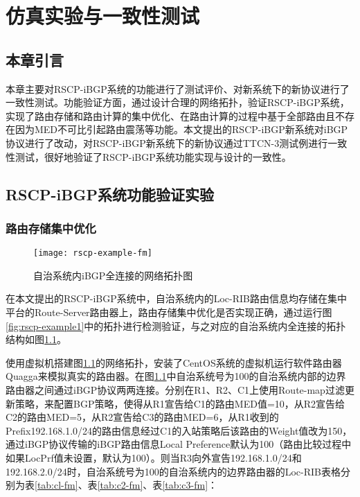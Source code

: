 \chapter{仿真实验与一致性测试}
\label{cha:evaluate}


\section{本章引言}
本章主要对RSCP-iBGP系统的功能进行了测试评价、对新系统下的新协议进行了一致性测试。功能验证方面，通过设计合理的网络拓扑，验证RSCP-iBGP系统，实现了路由存储和路由计算的集中优化、在路由计算的过程中基于全部路由且不存在因为MED不可比引起路由震荡等功能。本文提出的RSCP-iBGP新系统对iBGP协议进行了改动，对RSCP-iBGP新系统下的新协议通过TTCN-3测试例进行一致性测试，很好地验证了RSCP-iBGP系统功能实现与设计的一致性。

\section{RSCP-iBGP系统功能验证实验}

\subsection{路由存储集中优化}


\begin{figure}
  \centering
  \texttt{[image: rscp-example-fm]}
  \caption{自治系统内iBGP全连接的网络拓扑图}
  \label{fig:rscp-example-fm}
\end{figure}

在本文提出的RSCP-iBGP系统中，自治系统内的Loc-RIB路由信息均存储在集中平台的Route-Server路由器上，路由存储集中优化是否实现正确，通过运行图\ref{fig:rscp-example1}中的拓扑进行检测验证，与之对应的自治系统内全连接的拓扑结构如图\ref{fig:rscp-example-fm}。

使用虚拟机搭建图\ref{fig:rscp-example-fm}的网络拓扑，安装了CentOS系统的虚拟机运行软件路由器Quagga来模拟真实的路由器。在图\ref{fig:rscp-example-fm}中自治系统号为100的自治系统内部的边界路由器之间通过iBGP协议两两连接。分别在R1、R2、C1上使用Route-map过滤更新策略，来配置BGP策略，使得从R1宣告给C1的路由MED值=10，从R2宣告给C2的路由MED=5，从R2宣告给C3的路由MED=6，从R1收到的Prefix192.168.1.0/24的路由信息经过C1的入站策略后该路由的Weight值改为150，通过iBGP协议传输的iBGP路由信息Local Preference默认为100（路由比较过程中如果LocPrf值未设置，默认为100）。则当R3向外宣告192.168.1.0/24和192.168.2.0/24时，自治系统号为100的自治系统内的边界路由器的Loc-RIB表格分别为表\ref{tab:cl-fm}、表\ref{tab:c2-fm}、表\ref{tab:c3-fm}：

